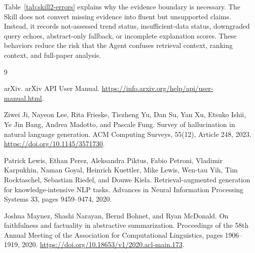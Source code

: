 \documentclass{article}
\begin{document}
Table~\ref{tab:skill2-errors} explains why the evidence boundary is necessary. The Skill does not convert missing evidence into fluent but unsupported claims. Instead, it records not-assessed trend status, insufficient-data status, downgraded query echoes, abstract-only fallback, or incomplete explanation scores. These behaviors reduce the risk that the Agent confuses retrieval context, ranking context, and full-paper analysis.

\begin{thebibliography}{9}

arXiv.
\newblock arXiv API User Manual.
\newblock \url{https://info.arxiv.org/help/api/user-manual.html}.

Ziwei Ji, Nayeon Lee, Rita Frieske, Tiezheng Yu, Dan Su, Yan Xu, Etsuko Ishii, Ye Jin Bang, Andrea Madotto, and Pascale Fung.
\newblock Survey of hallucination in natural language generation.
\newblock ACM Computing Surveys, 55(12), Article 248, 2023.
\newblock \url{https://doi.org/10.1145/3571730}.

Patrick Lewis, Ethan Perez, Aleksandra Piktus, Fabio Petroni, Vladimir Karpukhin, Naman Goyal, Heinrich Kuettler, Mike Lewis, Wen-tau Yih, Tim Rocktaschel, Sebastian Riedel, and Douwe Kiela.
\newblock Retrieval-augmented generation for knowledge-intensive NLP tasks.
\newblock Advances in Neural Information Processing Systems 33, pages 9459--9474, 2020.

Joshua Maynez, Shashi Narayan, Bernd Bohnet, and Ryan McDonald.
\newblock On faithfulness and factuality in abstractive summarization.
\newblock Proceedings of the 58th Annual Meeting of the Association for Computational Linguistics, pages 1906--1919, 2020.
\newblock \url{https://doi.org/10.18653/v1/2020.acl-main.173}.

\end{thebibliography}
\end{document}
